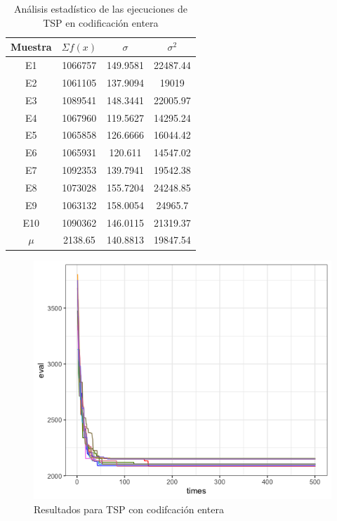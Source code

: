 \documentclass[letterpaper,12pt]{article}
\theoremstyle{definition}
\begin{document}
\begin{table}
  \begin{center}
    \begin{tabular}{cccc}
      \toprule 
        Muestra & \(\Sigma f(x)\) & \(\sigma\)  & \(\sigma^2\)  \\
        \midrule
        \rowcolor{black!20} E1 & 1066757 & 149.9581 & 22487.44 \\
        E2 & 1061105 & 137.9094 & 19019 \\
        \rowcolor{black!20} E3 & 1089541 & 148.3441 & 22005.97\\
        E4 & 1067960 & 119.5627 & 14295.24\\
        \rowcolor{black!20} E5 & 1065858 & 126.6666 & 16044.42 \\
        E6 & 1065931 & 120.611 & 14547.02 \\
        \rowcolor{black!20} E7 & 1092353 & 139.7941 & 19542.38 \\
        E8 & 1073028 & 155.7204 & 24248.85\\
        \rowcolor{black!20} E9 & 1063132 & 158.0054 & 24965.7 \\
        E10 & 1090362 & 146.0115 & 21319.37 \\
        \rowcolor{black!20} \(\mu\) & 2138.65 & 140.8813 & 19847.54 \\ 
        \bottomrule
      \end{tabular}
  \end{center}
  \caption{Análisis estadístico de las ejecuciones de TSP en codificación entera}
  \label{tab:tspint}  
\end{table}


\begin{figure}[H]
  \includegraphics[width=\linewidth]{int_tsp}
  \caption{Resultados para TSP con codifcación entera}
  \label{fig:tspint}
\end{figure}
\end{document}
